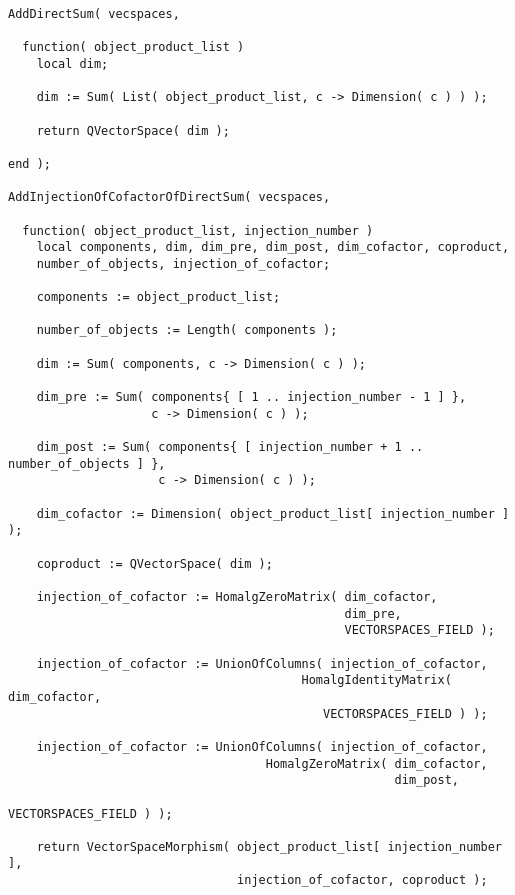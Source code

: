 \begin{small}
\begin{Verbatim}[frame=single]
AddDirectSum( vecspaces,

  function( object_product_list )
    local dim;
    
    dim := Sum( List( object_product_list, c -> Dimension( c ) ) );
    
    return QVectorSpace( dim );
  
end );

AddInjectionOfCofactorOfDirectSum( vecspaces,

  function( object_product_list, injection_number )
    local components, dim, dim_pre, dim_post, dim_cofactor, coproduct,
    number_of_objects, injection_of_cofactor;
    
    components := object_product_list;
    
    number_of_objects := Length( components );
    
    dim := Sum( components, c -> Dimension( c ) );
    
    dim_pre := Sum( components{ [ 1 .. injection_number - 1 ] },
                    c -> Dimension( c ) );
    
    dim_post := Sum( components{ [ injection_number + 1 .. number_of_objects ] },
                     c -> Dimension( c ) );
    
    dim_cofactor := Dimension( object_product_list[ injection_number ] );
    
    coproduct := QVectorSpace( dim );
    
    injection_of_cofactor := HomalgZeroMatrix( dim_cofactor,
                                               dim_pre,
                                               VECTORSPACES_FIELD );
    
    injection_of_cofactor := UnionOfColumns( injection_of_cofactor, 
                                         HomalgIdentityMatrix( dim_cofactor,
                                            VECTORSPACES_FIELD ) );
    
    injection_of_cofactor := UnionOfColumns( injection_of_cofactor, 
                                    HomalgZeroMatrix( dim_cofactor,
                                                      dim_post,
                                                      VECTORSPACES_FIELD ) );
    
    return VectorSpaceMorphism( object_product_list[ injection_number ],
                                injection_of_cofactor, coproduct );


\end{Verbatim}
\end{small}
